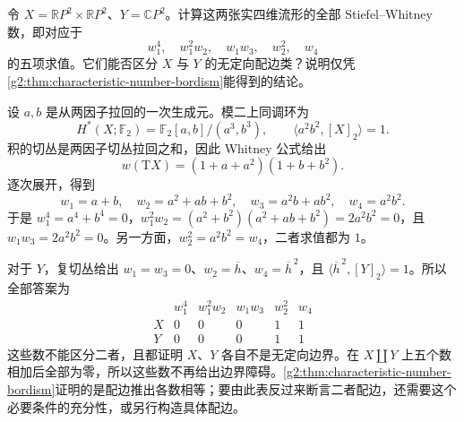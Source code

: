 \begin{exercise}\label{g2:ex:projective-product-bordism-numbers}
	令 \(X=\mathbb RP^2\times\mathbb RP^2\)、\(Y=\mathbb CP^2\)。计算这两张实四维流形的全部 Stiefel--Whitney 数，即对应于
	\[
		w_1^4,\quad w_1^2w_2,\quad w_1w_3,\quad w_2^2,\quad w_4
	\]
	的五项求值。它们能否区分 \(X\) 与 \(Y\) 的无定向配边类？说明仅凭\cref{g2:thm:characteristic-number-bordism}能得到的结论。
\end{exercise}
\begin{solution}
	设 \(a,b\) 是从两因子拉回的一次生成元。模二上同调环为
	\[
		H^*(X;\mathbb F_2)=\mathbb F_2[a,b]/(a^3,b^3),\qquad
		\langle a^2b^2,[X]_2\rangle=1.
	\]
	积的切丛是两因子切丛拉回之和，因此 Whitney 公式给出
	\[
		w(\mathrm TX)=(1+a+a^2)(1+b+b^2).
	\]
	逐次展开，得到
	\[
		w_1=a+b,\quad w_2=a^2+ab+b^2,\quad
		w_3=a^2b+ab^2,\quad w_4=a^2b^2.
	\]
	于是 \(w_1^4=a^4+b^4=0\)，\(w_1^2w_2=(a^2+b^2)(a^2+ab+b^2)=2a^2b^2=0\)，且 \(w_1w_3=2a^2b^2=0\)。另一方面，\(w_2^2=a^2b^2=w_4\)，二者求值都为 \(1\)。

	对于 \(Y\)，复切丛给出 \(w_1=w_3=0\)、\(w_2=\overline h\)、\(w_4=\overline h^{\,2}\)，且 \(\langle\overline h^{\,2},[Y]_2\rangle=1\)。所以全部答案为
	\[
	\begin{array}{c|ccccc}
		& w_1^4&w_1^2w_2&w_1w_3&w_2^2&w_4\\ \hline
		X&0&0&0&1&1\\
		Y&0&0&0&1&1
	\end{array}
	\]
	这些数不能区分二者，且都证明 \(X\)、\(Y\) 各自不是无定向边界。在 \(X\amalg Y\) 上五个数相加后全部为零，所以这些数不再给出边界障碍。\cref{g2:thm:characteristic-number-bordism}证明的是配边推出各数相等；要由此表反过来断言二者配边，还需要这个必要条件的充分性，或另行构造具体配边。
\end{solution}

